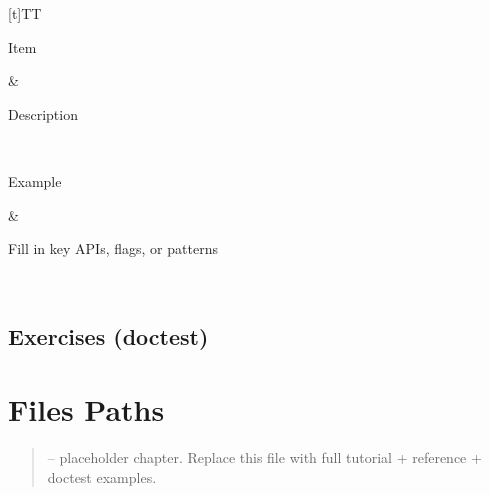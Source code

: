 \documentclass[a4paper,11pt,english]{sphinxmanual}
\begin{document}
\begin{savenotes}\sphinxattablestart
\sphinxthistablewithglobalstyle
\centering
\begin{tabulary}{\linewidth}[t]{TT}
\sphinxtoprule
\begin{varwidth}[t]{}
\sphinxstyletheadfamily \sphinxAtStartPar
Item
\sphinxbeforeendvarwidth
\end{varwidth}%
&\begin{varwidth}[t]{}
\sphinxstyletheadfamily \sphinxAtStartPar
Description
\sphinxbeforeendvarwidth
\end{varwidth}%
\\
\sphinxmidrule
\sphinxtableatstartofbodyhook\begin{varwidth}[t]{}
\sphinxAtStartPar
Example
\sphinxbeforeendvarwidth
\end{varwidth}%
&\begin{varwidth}[t]{}
\sphinxAtStartPar
Fill in key APIs, flags, or patterns
\sphinxbeforeendvarwidth
\end{varwidth}%
\\
\sphinxbottomrule
\end{tabulary}
\sphinxtableafterendhook\par
\sphinxattableend\end{savenotes}


\subsection{Exercises (doctest)}
\label{\detokenize{stdlib/dates_times:exercises-doctest}}
\begin{sphinxVerbatim}[commandchars=\\\{\}]
\end{sphinxVerbatim}

\sphinxstepscope


\section{Files Paths}
\label{\detokenize{stdlib/files_paths:files-paths}}\label{\detokenize{stdlib/files_paths::doc}}\begin{quote}

\sphinxAtStartPar
{} – placeholder chapter. Replace this file with full tutorial + reference + doctest examples.
\end{quote}
\end{document}

